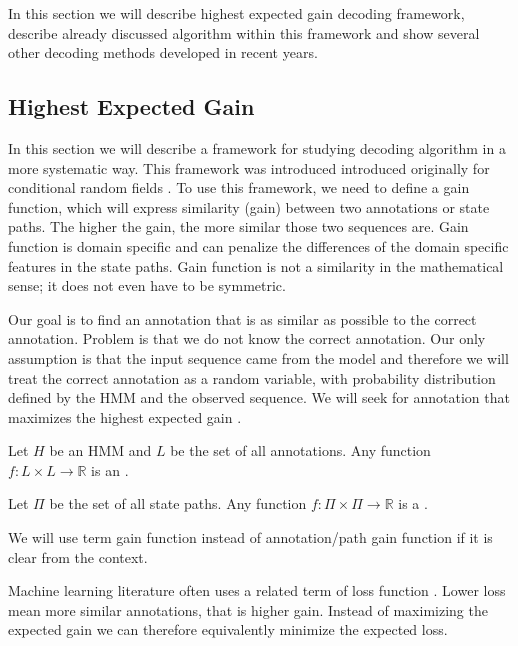 In this section we will describe highest expected gain decoding framework,
describe already discussed algorithm within this framework and show several
other decoding methods developed in recent years.

\subsection{Highest Expected Gain}

\label{SECTION:HEG}

In this section we will describe a framework for studying decoding algorithm in
a more systematic way. This framework was introduced introduced originally for
conditional random fields \cite{Gross2007}.  To use this framework, we need to
define a gain function, which will express similarity (gain) between two
annotations or state paths. The higher the gain, the more similar those two
sequences are. Gain function is domain specific and can penalize the differences
of the domain specific features in the state paths.  Gain function is not a
similarity in the mathematical sense; it does not even have to be symmetric.

Our goal is to find an annotation that is as similar as possible to the correct
annotation. Problem is that we do not know the correct annotation. Our only
assumption is that the input sequence came from the model and therefore we will
treat the correct annotation as a random variable, with probability distribution
defined by the HMM and the observed sequence. We will seek for annotation that
maximizes the highest expected gain \cite{Nanasi2010,Nanasi2010mgr}.

\begin{definition}
Let $H$ be an HMM and $L$ be the set of all annotations. Any function
$f:L\times L\to \mathbb{R}$ is an .

Let $\Pi$ be the set of all state paths. Any function $f:\Pi\times
\Pi\to\mathbb{R}$ is a .

\end{definition}

\begin{note}
We will use term gain function instead of annotation/path gain function if it is
clear from the context.

Machine learning literature often uses a related term of loss function
\cite{}. Lower loss mean more similar annotations, that is higher gain. Instead
of maximizing the expected gain we can therefore equivalently minimize the expected
loss.
\end{note}

